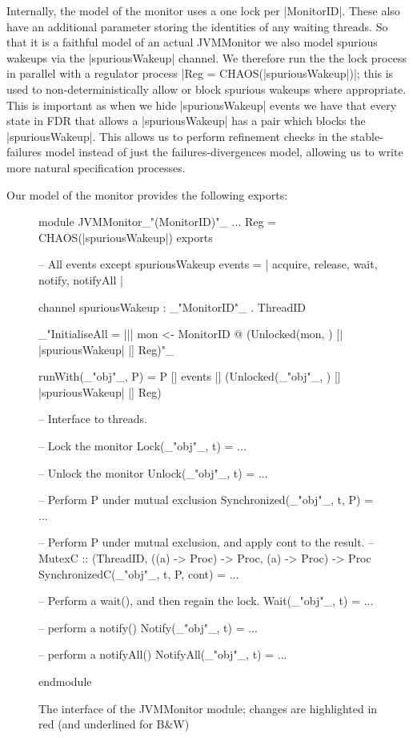 Internally, the model of the monitor uses a one lock per |MonitorID|. These also have an additional parameter storing the identities of any waiting threads. So that it is a faithful model of an actual JVMMonitor we also model spurious wakeups via the |spuriousWakeup| channel. We therefore run the the lock process in parallel with a regulator process |Reg = CHAOS({|spuriousWakeup|})|; this is used to non-deterministically allow or block spurious wakeups where appropriate. This is important as when we hide |spuriousWakeup| events we have that every state in FDR that allows a |spuriousWakeup| has a pair which blocks the |spuriousWakeup|. This allows us to perform refinement checks in the stable-failures model instead of just the failures-divergences model, allowing us to write more natural specification processes.

Our model of the monitor provides the following exports:

\begin{figure}[H]
\begin{cspm}
module JVMMonitor_"(MonitorID)"_
    ...
    Reg = CHAOS({|spuriousWakeup|})
exports

    -- All events except spuriousWakeup
    events = {| acquire, release, wait, notify, notifyAll |}

    channel spuriousWakeup : _"MonitorID"_ . ThreadID
  
    _"InitialiseAll =
      ||| mon <- MonitorID @ (Unlocked(mon, {})  [| {|spuriousWakeup|} |] Reg)"_

    runWith(_"obj"_, P) = P [| events |] (Unlocked(_"obj"_, {})  [| {|spuriousWakeup|} |] Reg)

    -- Interface to threads.

    -- Lock the monitor
    Lock(_"obj"_, t) = ...

    -- Unlock the monitor
    Unlock(_"obj"_, t) = ...

    -- Perform P under mutual exclusion
    Synchronized(_"obj"_, t, P) = ...

    -- Perform P under mutual exclusion, and apply cont to the result. 
    -- MutexC :: (ThreadID, ((a) -> Proc) -> Proc, (a) -> Proc) -> Proc
    SynchronizedC(_"obj"_, t, P, cont) = ...

    -- Perform a wait(), and then regain the lock.
    Wait(_"obj"_, t) = ... 

    -- perform a notify()
    Notify(_"obj"_, t) = ...

    -- perform a notifyAll()
    NotifyAll(_"obj"_, t) = ...

endmodule
\end{cspm}
\caption{The interface of the JVMMonitor module; changes are highlighted in red (and underlined for B\&W)}
\end{figure}

